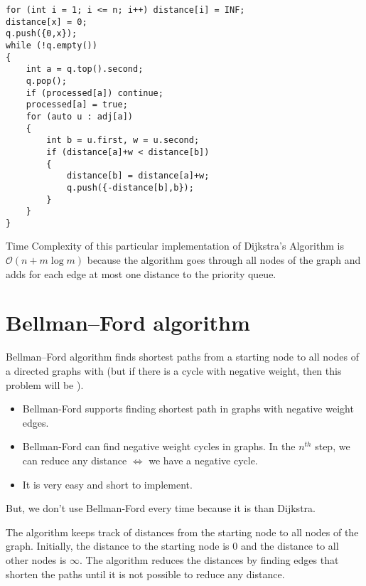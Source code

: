 \documentclass[twoside,12pt,a4paper,english]{book}
\theoremstyle{definition}
\theoremstyle{problemstyle}
\theoremstyle{problemstyle}
\theoremstyle{problemstyle}
\begin{document}
\begin{tcolorbox}[title=Solution]

\begin{lstlisting}
for (int i = 1; i <= n; i++) distance[i] = INF;
distance[x] = 0;
q.push({0,x});
while (!q.empty()) 
{
    int a = q.top().second;
    q.pop();
    if (processed[a]) continue;
    processed[a] = true;
    for (auto u : adj[a]) 
    {
        int b = u.first, w = u.second;
        if (distance[a]+w < distance[b]) 
        {
            distance[b] = distance[a]+w;
            q.push({-distance[b],b});
        }
    }
}
\end{lstlisting}

Time Complexity of this particular implementation of Dijkstra's Algorithm is $\mathcal{O}(n + m\log{m})$ because the algorithm goes through all nodes of the graph and adds for each edge at most one distance to the priority queue.


\end{tcolorbox}

\chapter{Bellman–Ford algorithm}

Bellman–Ford algorithm finds shortest paths from a starting node to all nodes of a directed graphs with (but if there is a cycle with negative weight, then this problem will be ).


\begin{tcolorbox}[title=Advantages of using Bellman-Ford over Dijkstra]
\begin{itemize}
    \setlength\itemsep{1em}
    \item Bellman-Ford supports finding shortest path in graphs with negative weight edges.
    \item Bellman-Ford can find negative weight cycles in graphs. In the $n^{th}$ step, we can reduce any distance $\iff$ we have a negative cycle.
    \item It is very easy and short to implement.
\end{itemize}
\end{tcolorbox}


But, we don't use Bellman-Ford every time because it is  than Dijkstra.

The algorithm keeps track of distances from the starting node to all nodes
of the graph. Initially, the distance to the starting node is $0$ and the distance to
all other nodes is $\infty$. The algorithm reduces the distances by finding edges
that shorten the paths until it is not possible to reduce any distance.
\end{document}
